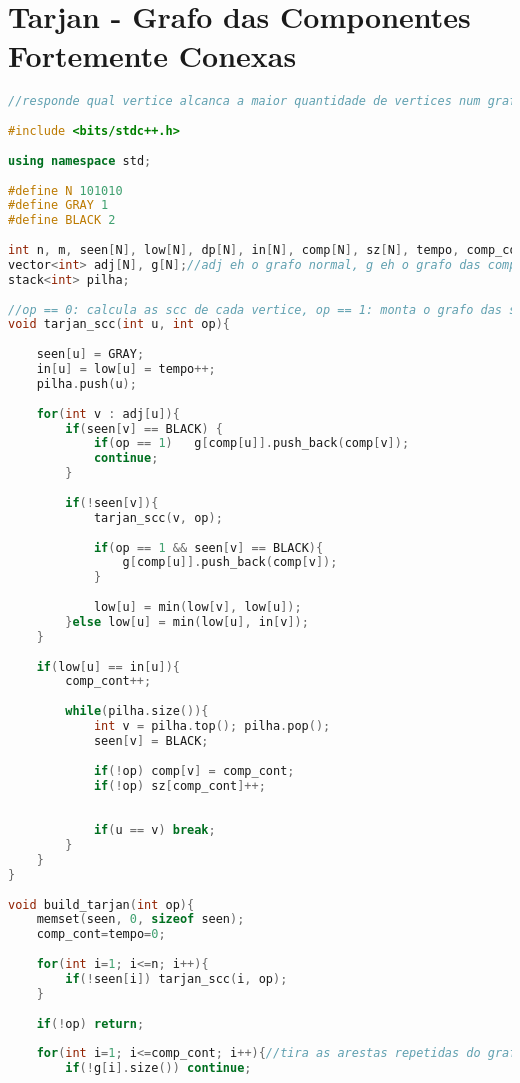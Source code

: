 \documentclass[12pt,a4paper,twoside]{report}
\begin{document}
\section{Tarjan - Grafo das Componentes Fortemente Conexas}
\noindent\begin{lstlisting}[caption=Tarjan - Grafo das Componentes Fortemente Conexas,language=C++]
//responde qual vertice alcanca a maior quantidade de vertices num grafo com N<=100000
 
#include <bits/stdc++.h>
 
using namespace std;
 
#define N 101010
#define GRAY 1
#define BLACK 2
 
int n, m, seen[N], low[N], dp[N], in[N], comp[N], sz[N], tempo, comp_cont;
vector<int> adj[N], g[N];//adj eh o grafo normal, g eh o grafo das componentes
stack<int> pilha;
 
//op == 0: calcula as scc de cada vertice, op == 1: monta o grafo das scc
void tarjan_scc(int u, int op){
     
    seen[u] = GRAY;
    in[u] = low[u] = tempo++;
    pilha.push(u);
     
    for(int v : adj[u]){
        if(seen[v] == BLACK) {
            if(op == 1)   g[comp[u]].push_back(comp[v]);
            continue;
        }
         
        if(!seen[v]){
            tarjan_scc(v, op);
             
            if(op == 1 && seen[v] == BLACK){
                g[comp[u]].push_back(comp[v]);
            }
 
            low[u] = min(low[v], low[u]);
        }else low[u] = min(low[u], in[v]);
    }
     
    if(low[u] == in[u]){
        comp_cont++;
 
        while(pilha.size()){
            int v = pilha.top(); pilha.pop();
            seen[v] = BLACK;
             
            if(!op) comp[v] = comp_cont;
            if(!op) sz[comp_cont]++;
 
 
            if(u == v) break;
        }
    }    
}
 
void build_tarjan(int op){
    memset(seen, 0, sizeof seen);
    comp_cont=tempo=0;
     
    for(int i=1; i<=n; i++){
        if(!seen[i]) tarjan_scc(i, op);
    }
     
    if(!op) return;
     
    for(int i=1; i<=comp_cont; i++){//tira as arestas repetidas do grafo das scc
        if(!g[i].size()) continue;
         

\end{lstlisting}
\end{document}
